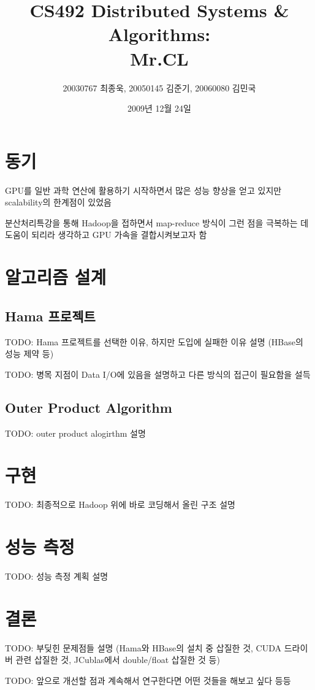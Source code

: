 \documentclass[a4paper]{article}
\begin{document}
\title{CS492 Distributed Systems \& Algorithms:\\ \textbf{Mr.CL}}
\author{20030767 최종욱, 20050145 김준기, 20060080 김민국}
\date{2009년 12월 24일}
\maketitle

\begin{multicols}{2}
\section{동기}
GPU를 일반 과학 연산에 활용하기 시작하면서 많은 성능 향상을 얻고 있지만 scalability의 한계점이 있었음

분산처리특강을 통해 Hadoop을 접하면서 map-reduce 방식이 그런 점을 극복하는 데 도움이 되리라 생각하고 GPU 가속을 결합시켜보고자 함

\section{알고리즘 설계}
\subsection{Hama 프로젝트}
TODO: Hama 프로젝트를 선택한 이유, 하지만 도입에 실패한 이유 설명 (HBase의 성능 제약 등)

TODO: 병목 지점이 Data I/O에 있음을 설명하고 다른 방식의 접근이 필요함을 설득

\subsection{Outer Product Algorithm}
TODO: outer product alogirthm 설명

\section{구현}
TODO: 최종적으로 Hadoop 위에 바로 코딩해서 올린 구조 설명

\section{성능 측정}
TODO: 성능 측정 계획 설명

\section{결론}
TODO: 부딪힌 문제점들 설명 (Hama와 HBase의 설치 중 삽질한 것, CUDA 드라이버 관련 삽질한 것, JCublas에서 double/float 삽질한 것 등)

TODO: 앞으로 개선할 점과 계속해서 연구한다면 어떤 것들을 해보고 싶다 등등

\end{multicols}
\end{document}
